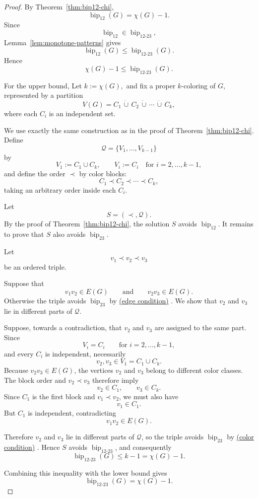\documentclass[12pt]{article}
\theoremstyle{plain}
\theoremstyle{definition}
\theoremstyle{remark}
\theoremstyle{definition}
\newcommand{\edgecondition}{%
  \hyperref[def:avoid:cond:edge]{(edge condition)}\xspace
}
\newcommand{\colorcondition}{%
  \hyperref[def:avoid:cond:color]{(color condition)}\xspace
}
\newcommand{\biplabel}{\mathrm{bip}}
\DeclareRobustCommand{\bipparam}[1]{%
  \ensuremath{\mathop{\biplabel}\nolimits_{#1}}%
}
\begin{document}
\begin{proof}
By Theorem~\ref{thm:bip12-chi},
\[
\bipparam{12}(G)=\chi(G)-1.
\]
Since
\[
\bipparam{12}\in\bipparam{12\text{-}23},
\]
Lemma~\ref{lem:monotone-patterns} gives
\[
\bipparam{12}(G)
\le
\bipparam{12\text{-}23}(G).
\]
Hence
\[
\chi(G)-1
\le
\bipparam{12\text{-}23}(G).
\]


For the upper bound, Let
\(
k:=\chi(G),
\)
and fix a proper \(k\)-coloring of \(G\), represented by a partition
\[
V(G)=C_1\,\dot\cup\,C_2\,\dot\cup\,\cdots\,\dot\cup\,C_k,
\]
where each \(C_i\) is an independent set.

We use exactly the same construction as in the proof of
Theorem~\ref{thm:bip12-chi}. Define
\[
\mathcal Q=\{V_1,\dots,V_{k-1}\}
\]
by
\[
V_1:=C_1\cup C_k,
\qquad
V_i:=C_i
\quad\text{for }i=2,\dots,k-1,
\]
and define the order \(\prec\) by color blocks:
\[
C_1\prec C_2\prec\cdots\prec C_k,
\]
taking an arbitrary order inside each \(C_i\).

Let
\[
S=(\prec,\mathcal Q).
\]
By the proof of Theorem~\ref{thm:bip12-chi}, the solution \(S\) avoids
\(\bipparam{12}\). It remains to prove that \(S\) also avoids
\(\bipparam{23}\).

Let
\[
v_1\prec v_2\prec v_3
\]
be an ordered triple.

Suppose that
\[
v_1v_2\in E(G)
\qquad\text{and}\qquad
v_2v_3\in E(G).
\]
Otherwise the triple avoids \(\bipparam{23}\) by \edgecondition.
We show that \(v_2\) and \(v_3\) lie in different parts of \(\mathcal Q\).

Suppose, towards a contradiction, that \(v_2\) and \(v_3\) are assigned to the same part. Since
\[
V_i=C_i
\qquad\text{for }i=2,\dots,k-1,
\]
and every \(C_i\) is independent, necessarily
\[
v_2,v_3\in V_1=C_1\cup C_k.
\]
Because \(v_2v_3\in E(G)\), the vertices \(v_2\) and \(v_3\) belong to different color classes. The block order and
\(v_2\prec v_3\) therefore imply
\[
v_2\in C_1,
\qquad
v_3\in C_k.
\]
Since \(C_1\) is the first block and \(v_1\prec v_2\), we must also have
\[
v_1\in C_1.
\]
But \(C_1\) is independent, contradicting
\[
v_1v_2\in E(G).
\]

Therefore \(v_2\) and \(v_3\) lie in different parts of \(\mathcal Q\), so the triple avoids
\(\bipparam{23}\) by \colorcondition. Hence \(S\) avoids
\(\bipparam{12\text{-}23}\), and consequently
\[
\bipparam{12\text{-}23}(G)
\le
k-1
=
\chi(G)-1.
\]

Combining this inequality with the lower bound gives
\[
\bipparam{12\text{-}23}(G)=\chi(G)-1.
\]

\end{proof}
\end{document}
